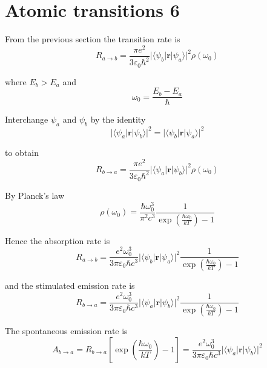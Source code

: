 

\section*{Atomic transitions 6}

From the previous section the transition rate is
\begin{equation*}
R_{a\rightarrow b}
=\frac{\pi e^2}{3\varepsilon_0\hbar^2}
\bigl|\langle\psi_b|\mathbf r|\psi_a\rangle\bigr|^2\rho(\omega_0)
\end{equation*}

where $E_b>E_a$ and
\begin{equation*}
\omega_0=\frac{E_b-E_a}{\hbar}
\end{equation*}

Interchange $\psi_a$ and $\psi_b$ by the identity
\begin{equation*}
\bigl|\langle\psi_a|\mathbf r|\psi_b\rangle\bigr|^2
=\bigl|\langle\psi_b|\mathbf r|\psi_a\rangle\bigr|^2
\end{equation*}

to obtain
\begin{equation*}
R_{b\rightarrow a}
=\frac{\pi e^2}{3\varepsilon_0\hbar^2}
\bigl|\langle\psi_a|\mathbf r|\psi_b\rangle\bigr|^2\rho(\omega_0)
\end{equation*}

By Planck's law
\begin{equation*}
\rho(\omega_0)=\frac{\hbar\omega_0^3}{\pi^2c^3}
\frac{1}{\exp\left(\frac{\hbar\omega_0}{kT}\right)-1}
\end{equation*}

Hence the absorption rate is
\begin{equation*}
R_{a\rightarrow b}
=\frac{e^2\omega_0^3}{3\pi\varepsilon_0\hbar c^3}
\bigl|\langle\psi_b|\mathbf r|\psi_a\rangle\bigr|^2
\frac{1}{\exp\left(\frac{\hbar\omega_0}{kT}\right)-1}
\tag{1}
\end{equation*}

and the stimulated emission rate is
\begin{equation*}
R_{b\rightarrow a}
=\frac{e^2\omega_0^3}{3\pi\varepsilon_0\hbar c^3}
\bigl|\langle\psi_a|\mathbf r|\psi_b\rangle\bigr|^2
\frac{1}{\exp\left(\frac{\hbar\omega_0}{kT}\right)-1}
\end{equation*}

The spontaneous emission rate is
\begin{equation*}
A_{b\rightarrow a}=R_{b\rightarrow a}
\left[\exp\left(\frac{\hbar\omega_0}{kT}\right)-1\right]
=\frac{e^2\omega_0^3}{3\pi\varepsilon_0\hbar c^3}
\bigl|\langle\psi_a|\mathbf r|\psi_b\rangle\bigr|^2
\tag{2}
\end{equation*}

